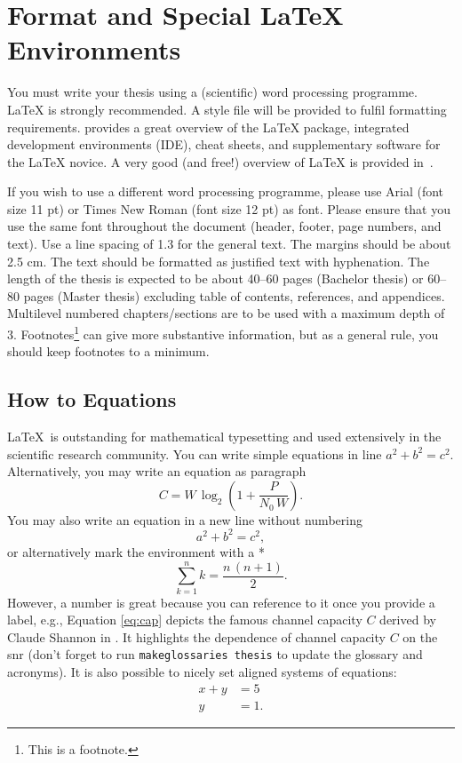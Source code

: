 \chapter{Format and Special \LaTeX{} Environments} 

You must write your thesis using a (scientific) word processing programme. \LaTeX{}
is strongly recommended. A style file will be provided to fulfil formatting requirements.
\cite{TUG} provides a great overview of the \LaTeX{} package, integrated development
environments (IDE), cheat sheets, and supplementary software for the \LaTeX{} novice. A
very good (and free!) overview of \LaTeX{} is provided in~\cite{Oet23}. 

If you wish to use a different word processing programme, please use Arial (font size 11
pt) or Times New Roman (font size 12 pt) as font. Please ensure that you use the same font
throughout the document (header, footer, page numbers, and text). Use a line spacing of
1.3 for the general text.  The margins should be about 2.5 cm. The text should be
formatted as justified text with hyphenation. The length of the thesis is expected to be
about 40--60 pages (Bachelor thesis) or 60--80 pages (Master thesis) excluding table of
contents, references, and appendices. Multilevel numbered chapters/sections are to be used
with a maximum depth of 3. Footnotes\footnote{This is a footnote.} can give more
substantive information, but as a general rule, you should keep footnotes to a minimum.

\section{How to Equations}
\LaTeX~is outstanding for mathematical typesetting and used extensively in the scientific
research community. You can write simple equations in line ${a^2 + b^2 = c^2}$.
Alternatively, you may write an equation as paragraph
\begin{equation}
    C = W \, \log_2 \left( 1 + \frac{P}{N_0 \, W} \right).  \label{eq:cap}
\end{equation}
You may also write an equation in a new line without numbering
\[ a^2 + b^2 = c^2, \]
or alternatively mark the environment with a *
\begin{equation*}
    \sum_{k=1}^n k = \frac{n\,(n+1)}{2}.
\end{equation*}
However, a number is great because you can reference to it once you provide a label, e.g.,
Equation \eqref{eq:cap} depicts the famous channel capacity $C$ derived by Claude Shannon
in \cite{Sha48}. It highlights the dependence of channel capacity $C$ on the \acrfull{snr}
(don't forget to run \texttt{makeglossaries thesis} to update the glossary and acronyms).
It is also possible to nicely set aligned systems of equations:
\begin{align}
    x + y & = 5 \\
    y & = 1.
\end{align}

